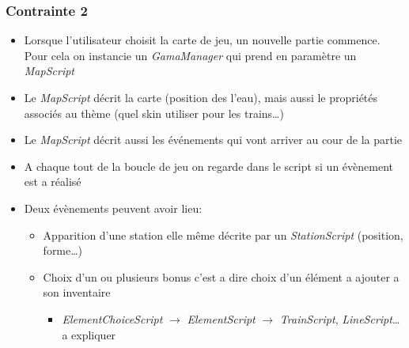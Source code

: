 \documentclass[report, backcover, french, nodocumentinfo]{upmethodology-document}
\begin{document}
				\subsubsection{Contrainte 2}
					\begin{itemize}
						\item Lorsque l'utilisateur choisit la carte de jeu, un nouvelle partie commence. Pour cela on instancie un \textit{GamaManager} qui prend en paramètre un \textit{MapScript}
						\item Le \textit{MapScript} décrit la carte (position des l'eau), mais aussi le propriétés associés au thème (quel skin utiliser pour les trains\ldots)
						\item Le \textit{MapScript} décrit aussi les événements qui vont arriver au cour de la partie
						\item A	chaque tout de la boucle de jeu on regarde dans le script si un évènement est a réalisé
						\item Deux évènements peuvent avoir lieu:
							\begin{itemize}
								\item Apparition d'une station elle même décrite par un \textit{StationScript} (position, forme\ldots)
								\item Choix d'un ou plusieurs bonus c'est a dire choix d'un élément a ajouter a son inventaire
									\begin{itemize}
										\item \textit{ElementChoiceScript} $\longrightarrow$ \textit{ElementScript} $\longrightarrow$ \textit{TrainScript}, \textit{LineScript}\ldots a expliquer
									\end{itemize}
							\end{itemize}
					\end{itemize}
\end{document}

